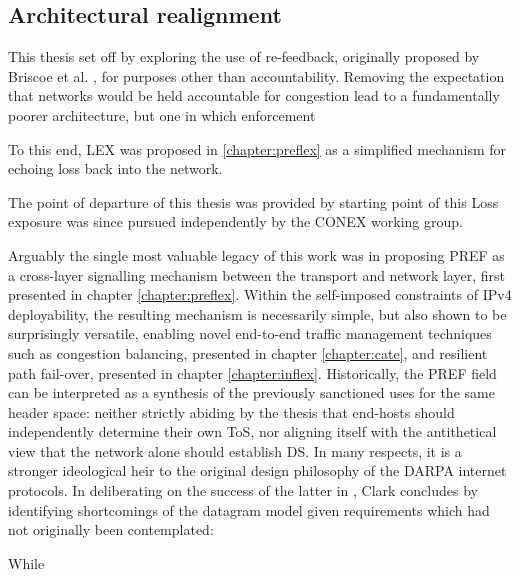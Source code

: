 \subsection{Architectural realignment}

This thesis set off by exploring the use of re-feedback, originally proposed by Briscoe et al. \cite{}, for purposes other than accountability.
Removing the expectation that networks would be held accountable for congestion lead to a fundamentally poorer architecture, but one in which enforcement


To this end, \ac{LEX} was proposed in \ref{chapter:preflex} as a simplified mechanism for echoing loss back into the network.

The point of departure of this thesis was provided by 
starting point of this 
Loss exposure was since pursued independently by the \ac{CONEX} working group.

Arguably the single most valuable legacy of this work was in proposing \acf{PREF} as a cross-layer signalling mechanism between the transport and network layer, first presented in chapter \ref{chapter:preflex}.
Within the self-imposed constraints of \ac{IPv4} deployability, the resulting mechanism is necessarily simple, but also shown to be surprisingly versatile, enabling novel end-to-end traffic management techniques such as congestion balancing, presented in chapter \ref{chapter:cate}, and resilient path fail-over, presented in chapter \ref{chapter:inflex}.
Historically, the \ac{PREF} field can be interpreted as a synthesis of the previously sanctioned uses for the same header space: neither strictly abiding by the thesis that end-hosts should independently determine their own \acf{ToS}, nor aligning itself with the antithetical view that the network alone should establish \acf{DS}.
In many respects, it is a stronger ideological heir to the original design philosophy of the \ac{DARPA} internet protocols. 
In deliberating on the success of the latter in \cite{Clark:1988p478}, Clark concludes by identifying shortcomings of the datagram model given requirements which had not originally been contemplated:

While







